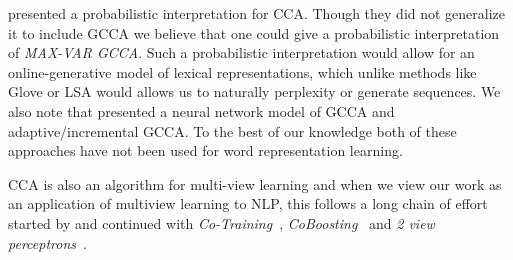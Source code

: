 \documentclass[11pt]{article}
\begin{document}
 presented a probabilistic
interpretation for CCA. Though they did not generalize it to include
GCCA we believe that one could give a probabilistic interpretation of
\emph{MAX-VAR GCCA}.  Such a
probabilistic interpretation would allow for an online-generative model of
lexical representations, which unlike methods like Glove or LSA would
allows us to naturally perplexity or generate sequences. We also note
that  presented a neural network model of GCCA
and adaptive/incremental GCCA.  To the best of our knowledge both of these approaches have not been used for word representation learning.

CCA is also an algorithm
for multi-view learning \cite{kakade2007multi,ganchevuai08} and when we view our work as an application of multiview learning to NLP, this follows a long chain of effort started by
 and continued with
\emph{Co-Training}~\cite{blum1998combining},
\emph{CoBoosting}~\cite{collins1999unsupervised} and \emph{2 view
  perceptrons}~\cite{brefeld2006efficient}.
\end{document}
